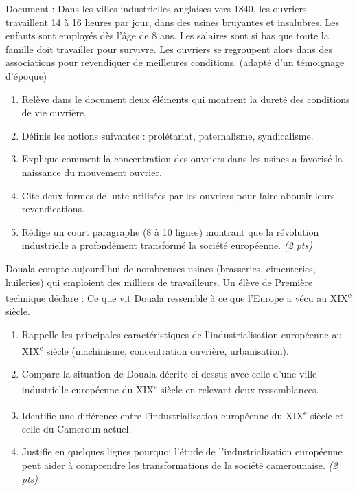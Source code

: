 \documentclass[11pt]{article}
\begin{document}
\begin{exercice}
Document : \og{} Dans les villes industrielles anglaises vers 1840, les ouvriers travaillent 14 à 16 heures par jour, dans des usines bruyantes et insalubres. Les enfants sont employés dès l'âge de 8 ans. Les salaires sont si bas que toute la famille doit travailler pour survivre. Les ouvriers se regroupent alors dans des associations pour revendiquer de meilleures conditions. \fg{} (adapté d'un témoignage d'époque)

\begin{enumerate}
\item Relève dans le document deux éléments qui montrent la dureté des conditions de vie ouvrière.
\item Définis les notions suivantes : prolétariat, paternalisme, syndicalisme.
\item Explique comment la concentration des ouvriers dans les usines a favorisé la naissance du mouvement ouvrier.
\item Cite deux formes de lutte utilisées par les ouvriers pour faire aboutir leurs revendications.
\item Rédige un court paragraphe (8 à 10 lignes) montrant que la révolution industrielle a profondément transformé la société européenne. \textit{(2 pts)}
\end{enumerate}
\end{exercice}

\begin{exercice}
Douala compte aujourd'hui de nombreuses usines (brasseries, cimenteries, huileries) qui emploient des milliers de travailleurs. Un élève de Première technique déclare : \og{} Ce que vit Douala ressemble à ce que l'Europe a vécu au XIX\textsuperscript{e} siècle. \fg{}

\begin{enumerate}
\item Rappelle les principales caractéristiques de l'industrialisation européenne au XIX\textsuperscript{e} siècle (machinisme, concentration ouvrière, urbanisation).
\item Compare la situation de Douala décrite ci-dessus avec celle d'une ville industrielle européenne du XIX\textsuperscript{e} siècle en relevant deux ressemblances.
\item Identifie une différence entre l'industrialisation européenne du XIX\textsuperscript{e} siècle et celle du Cameroun actuel.
\item Justifie en quelques lignes pourquoi l'étude de l'industrialisation européenne peut aider à comprendre les transformations de la société camerounaise. \textit{(2 pts)}
\end{enumerate}
\end{exercice}
\end{document}
